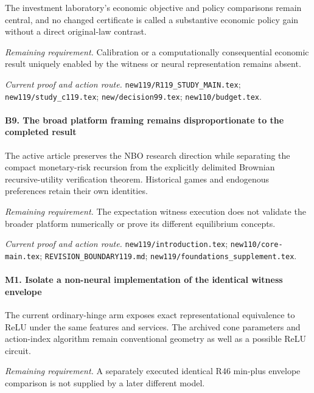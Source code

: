 The investment laboratory's economic objective and policy comparisons remain central, and no changed certificate is called a substantive economic policy gain without a direct original-law contrast.

\par\emph{Remaining requirement.} Calibration or a computationally consequential economic result uniquely enabled by the witness or neural representation remains absent.

\par\emph{Current proof and action route.} \nolinkurl{new119/R119_STUDY_MAIN.tex}; \nolinkurl{new119/study_c119.tex}; \nolinkurl{new/decision99.tex}; \nolinkurl{new110/budget.tex}.

\paragraph{B9. The broad platform framing remains disproportionate to the completed result}

The active article preserves the NBO research direction while separating the compact monetary-risk recursion from the explicitly delimited Brownian recursive-utility verification theorem. Historical games and endogenous preferences retain their own identities.

\par\emph{Remaining requirement.} The expectation witness execution does not validate the broader platform numerically or prove its different equilibrium concepts.

\par\emph{Current proof and action route.} \nolinkurl{new119/introduction.tex}; \nolinkurl{new110/core-main.tex}; \nolinkurl{REVISION_BOUNDARY119.md}; \nolinkurl{new119/foundations_supplement.tex}.

\paragraph{M1. Isolate a non-neural implementation of the identical witness envelope}

The current ordinary-hinge arm exposes exact representational equivalence to ReLU under the same features and services. The archived cone parameters and action-index algorithm remain conventional geometry as well as a possible ReLU circuit.

\par\emph{Remaining requirement.} A separately executed identical R46 min-plus envelope comparison is not supplied by a later different model.


